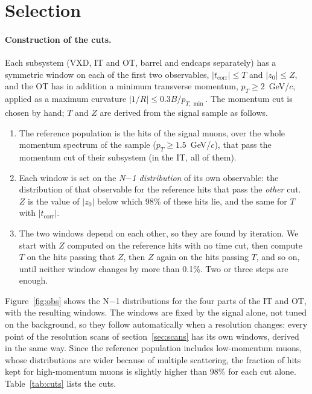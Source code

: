 \IfFileExists{jinst.cls}{\documentclass[a4paper,11pt]{jinst}}
\newcommand{\pT}{p_T}
\newcommand{\tc}{t_\mathrm{corr}}
\begin{document}
\section{Selection}\label{sec:selection}

\paragraph{Construction of the cuts.} Each subsystem (VXD, IT and OT, barrel and endcaps separately)
has a symmetric window on each of the first two observables, $|\tc|\le T$ and $|z_0|\le Z$, and the
OT has in addition a minimum transverse momentum, $\pT\ge2$~GeV/$c$, applied as a maximum curvature
$|1/R|\le0.3B/p_{T,\min}$. The momentum cut is chosen by hand; $T$ and $Z$ are derived from the
signal sample as follows.
\begin{enumerate}
  \item The reference population is the hits of the signal muons, over the whole momentum spectrum of
    the sample ($\pT\ge1.5$~GeV/$c$), that pass the momentum cut of their subsystem (in the IT, all of
    them).
  \item Each window is set on the \emph{N$-$1 distribution} of its own observable: the distribution of
    that observable for the reference hits that pass the \emph{other} cut. $Z$ is the value of $|z_0|$
    below which 98\% of these hits lie, and the same for $T$ with $|\tc|$.
  \item The two windows depend on each other, so they are found by iteration. We start with $Z$
    computed on the reference hits with no time cut, then compute $T$ on the hits passing that $Z$,
    then $Z$ again on the hits passing $T$, and so on, until neither window changes by more than
    0.1\%. Two or three steps are enough.
\end{enumerate}
Figure~\ref{fig:obs} shows the N$-$1 distributions for the four parts of the IT and OT, with the
resulting windows. The windows are fixed by the signal alone, not tuned on the background, so they
follow automatically when a resolution changes: every point of the resolution scans of
section~\ref{sec:scans} has its own windows, derived in the same way. Since the reference population
includes low-momentum muons, whose distributions are wider because of multiple scattering, the
fraction of hits kept for high-momentum muons is slightly higher than 98\% for each cut alone.
Table~\ref{tab:cuts} lists the cuts.
\end{document}
